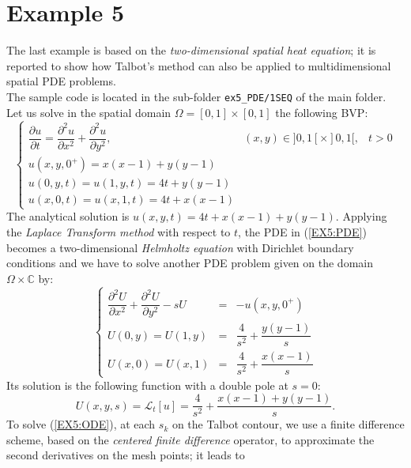 \documentclass[a4paper,10pt]{report}%
\begin{document}
\section{Example 5}\label{SECT:5}
The last example is based on the {\em two-dimensional spatial heat equation}; it is reported to show how Talbot's method can also be applied to multidimensional spatial PDE problems.
\\
The sample code is located in the sub-folder {\tt ex5\_PDE/1SEQ} of the main folder.
\\
Let us solve in the spatial domain $\Omega=[0,1]\times[0,1]$ the following BVP:
\begin{equation}\label{EX5:PDE}
\left\{
\begin{array}{lll}
\dfrac{\partial u}{\partial t} = \dfrac{\partial^2 u}{\partial x^2} + \dfrac{\partial^2 u}{\partial y^2}, & (x,y)\in]0,1[\times]0,1[, & t>0 \\[8pt]
u(x,y,0^+) = x(x-1) + y(y-1)      \\
u(0,y,t) = u(1,y,t) = 4t+y(y-1)  \\
u(x,0,t) = u(x,1,t) = 4t+x(x-1)
\end{array}
\right.
\end{equation}
The analytical solution is $u(x,y,t)=4t+x(x-1)+y(y-1)$. Applying the {\em Laplace Transform method} with respect to $t$, the PDE in (\ref{EX5:PDE}) becomes a two-dimensional {\em Helmholtz equation} with Dirichlet boundary conditions and we have to solve another PDE problem given on the domain $\Omega\times{\mathbb C}$ by:
\begin{equation}\label{EX5:ODE}
\left\{
\begin{array}{lcl}
\dfrac{\partial^2 U}{\partial x^2} + \dfrac{\partial^2 U}{\partial y^2} - sU &=& - u(x,y,0^+) \\[8pt]
U(0,y) = U(1,y) &=& \dfrac{4}{s^2} + \dfrac{y(y - 1)}{s}                                  \\[8pt]
U(x,0) = U(x,1) &=& \dfrac{4}{s^2} + \dfrac{x(x - 1)}{s}
\end{array}
\right.
\end{equation}
Its solution is the following function with a double pole at $s=0$:
\[
U(x,y,s) = \mathscr{L}_t[u] = \frac{4}{s^2} + \frac{x(x-1) + y(y-1)}{s}.
\]
To solve (\ref{EX5:ODE}), at each $s_k$ on the Talbot contour, we use a finite difference scheme, based on the
{\em centered finite difference} operator, to approximate the second derivatives on the mesh points; it leads to
\end{document}
